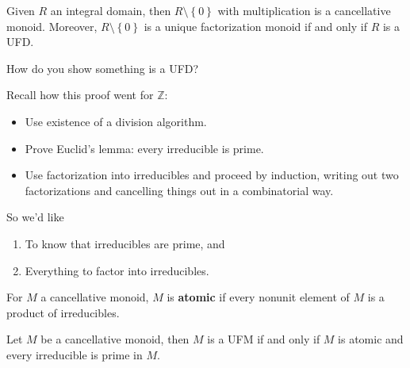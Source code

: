 \begin{remark}

Given \(R\) an integral domain, then \(R\setminus\left\{{0}\right\}\)
with multiplication is a cancellative monoid. Moreover,
\(R\setminus\left\{{0}\right\}\) is a unique factorization monoid if and
only if \(R\) is a UFD.

\end{remark}

\begin{question}

How do you show something is a UFD?

\end{question}

\begin{answer}

Recall how this proof went for \({\mathbb{Z}}\):

\begin{itemize}
\tightlist
\item
  Use existence of a division algorithm.
\item
  Prove Euclid's lemma: every irreducible is prime.
\item
  Use factorization into irreducibles and proceed by induction, writing
  out two factorizations and cancelling things out in a combinatorial
  way.
\end{itemize}

So we'd like

\begin{enumerate}
\def\labelenumi{\arabic{enumi}.}
\tightlist
\item
  To know that irreducibles are prime, and
\item
  Everything to factor into irreducibles.
\end{enumerate}

\end{answer}

\begin{definition}[Atomic]

For \(M\) a cancellative monoid, \(M\) is \textbf{atomic} if every
nonunit element of \(M\) is a product of irreducibles.

\end{definition}

\begin{proposition}

Let \(M\) be a cancellative monoid, then \(M\) is a UFM if and only if
\(M\) is atomic and every irreducible is prime in \(M\).

\end{proposition}

